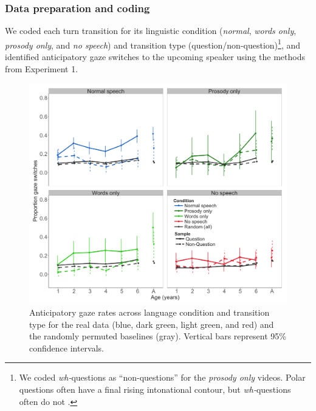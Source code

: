 \documentclass[authoryear, 12pt]{elsarticle}
\begin{document}

\subsubsection{Data preparation and coding}
We coded each turn transition for its linguistic condition (\textit{normal}, \textit{words only}, \textit{prosody only}, and \textit{no speech}) and transition type (question/non-question)\footnote{We coded \textit{wh-}questions as ``non-questions'' for the \textit{prosody only} videos. Polar questions often have a final rising intonational contour, but \textit{wh-}questions often do not  \citep{hedberg2010}.}, and identified anticipatory gaze switches to the upcoming speaker using the methods from Experiment 1.

\begin{figure}[!ht]
\begin{center}
\includegraphics[width=\textwidth]{figures/E2-samples-by-lang-groups-trans-types.png}
\end{center}
\caption{Anticipatory gaze rates across language condition and transition type for the real data (blue, dark green, light green, and red) and the randomly permuted baselines (gray). Vertical bars represent 95\% confidence intervals.} 
\label{fig:E2-randvsreal}
\end{figure}
\end{document}
